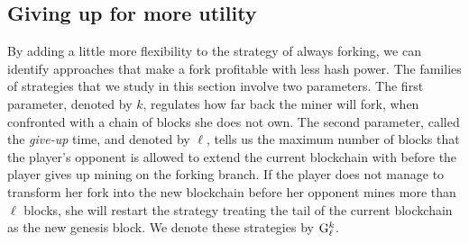 \documentclass[a4paper,english,cleveref, autoref,numberwithinsect]{lipics-v2019}
\newcommand{\df}{\text{\rm DF}}
\newcommand{\bdf}{\text{\rm {\bf DF}}}
\newcommand{\af}{\text{\rm AF}}
\newcommand{\baf}{\text{\rm {\bf AF}}}
\newcommand{\pf}[1]{\text{\rm F[{#1}]}}
\newcommand{\gup}{{\rm {G}}}
\begin{document}
%

\subsection{Giving up for more utility}
\label{sec-giving-up}


By adding a little more flexibility to the strategy of always forking, we can identify approaches that make a fork profitable with less hash power. The families of strategies that we study in this section involve two parameters. The first parameter, denoted by $k$, regulates how far back the miner will fork, when confronted with a chain of blocks she does not own. The second parameter, called the \textit{give-up} time, and denoted by $\ell$, tells us the maximum number of blocks that the player's opponent is allowed to extend the current blockchain with before the player gives up mining on the forking branch. If the player does not manage to transform her fork into the new blockchain before her opponent mines more than $\ell$ blocks, she will restart the strategy treating the tail of the current blockchain as the new genesis block. We denote these strategies by $\gup_\ell^k$. 
\end{document}
